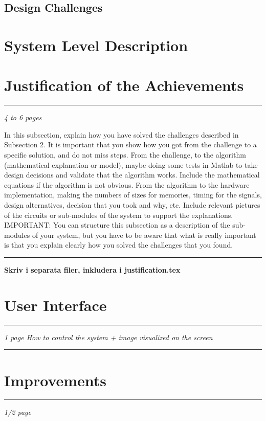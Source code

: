 \subsection{Design Challenges}\label{sec:designchallenges}


\section{System Level Description}\label{cha:syslvl}

\section{Justification of the Achievements}\label{cha:justice}
\hrule
\em 4 to 6 pages

In this subsection, explain how you have solved the challenges described in Subsection 2. It is important that you show how you got from the challenge to a specific solution, and do not miss steps. From the challenge, to the algorithm (mathematical explanation or model), maybe doing some tests in Matlab to take design decisions and validate that the algorithm works. Include the mathematical equations if the algorithm is not obvious. From the algorithm to the hardware implementation, making the numbers of sizes for memories, timing for the signals, design alternatives, decision that you took and why, etc. Include relevant pictures of the circuits or sub-modules of the system to support the explanations. IMPORTANT: You can structure this subsection as a description of the sub-modules of your system, but you have to be aware that what is really important is that you explain clearly how you solved the challenges that you found. \em
\hrule
\textbf{Skriv i separata filer, inkludera i justification.tex}


\section{User Interface}\label{cha:ui}
\hrule
\em 1 page
How to control the system + image visualized on the screen
\em
\hrule


\section{Improvements}\label{cha:improvements}
\hrule
\em 1/2 page

